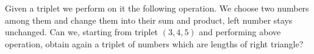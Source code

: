 Given a triplet we perform on it the following operation. We choose two numbers among them and change them into their sum and product, left number stays unchanged. Can we, starting from triplet $(3,4,5)$ and performing above operation, obtain again a triplet of numbers which are lengths of right triangle?